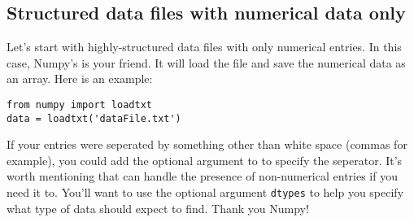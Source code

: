 \subsection*{Structured data files with numerical data only}
Let's start with highly-structured data files with only numerical entries.
In this case, Numpy's  is your friend.  It will load the
file and save the numerical data as an array.  Here is an example:
\begin{Verbatim}
from numpy import loadtxt
data = loadtxt('dataFile.txt')
\end{Verbatim}
If your entries were seperated by something other than white space
(commas for example), you could add the optional argument
 to  to specify the seperator.
It's worth mentioning that  can handle the presence of
non-numerical entries if you need it to.  You'll want to use the
optional argument \texttt{dtypes} to help you specify what type of
data  should expect to find.  Thank you Numpy!

